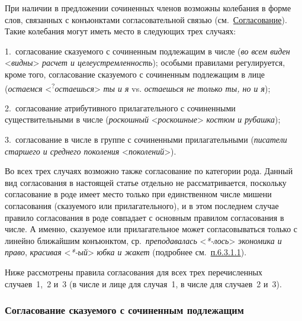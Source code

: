 При наличии в предложении сочиненных членов возможны колебания в форме
слов, связанных с конъюнктами согласовательной связью
(см.~\underline{Согласование}). Такие колебания могут иметь место в
следующих трех случаях:

1.~согласование сказуемого с сочиненным подлежащим в числе (\emph{во
всем виден} \textless{}\emph{видны}\textgreater{} \emph{расчет и
целеустремленность}); особыми правилами регулируется, кроме того,
согласование сказуемого с сочиненным подлежащим в лице (\emph{остаемся}
\textless{}\textsuperscript{?}\emph{остаешься}\textgreater{} \emph{ты и
я} vs. \emph{остаешься не только ты, но и я});

2.~согласование атрибутивного прилагательного с сочиненными
существительными в числе (\emph{роскошный}
\textless{}\emph{роскошные}\textgreater{} \emph{костюм и рубашка});

3.~согласование в числе в группе с сочиненными прилагательными
(\emph{писатели старшего и среднего поколения}
\textless{}\emph{поколений}\textgreater).

Во всех трех случаях возможно также согласование по категории рода.
Данный вид согласования в настоящей статье отдельно не рассматривается,
поскольку согласование в роде имеет место только при единственном числе
мишени согласования (сказуемого или прилагательного), и в этом последнем
случае правило согласования в роде совпадает с основным правилом
согласования в числе. А именно, сказуемое или прилагательное может
согласовываться только с линейно ближайшим конъюнктом,
ср.~\emph{преподавалась} \textless{}\emph{*-лось}\textgreater{}
\emph{экономика и право}, \emph{красивая}
\textless{}\emph{*-ый}\textgreater{} \emph{юбка и жакет} (подробнее
см.~\underline{п.6.3.1.1}).

Ниже рассмотрены правила согласования для всех трех перечисленных
случаев~1,~2 и~3 (в числе и лице для случая~1, в числе для случаев~2
и~3).

\hypertarget{ux441ux43eux433ux43bux430ux441ux43eux432ux430ux43dux438ux435-ux441ux43aux430ux437ux443ux435ux43cux43eux433ux43e-ux441-ux441ux43eux447ux438ux43dux435ux43dux43dux44bux43c-ux43fux43eux434ux43bux435ux436ux430ux449ux438ux43c}{%
\subsubsection{Согласование сказуемого с сочиненным
подлежащим}\label{ux441ux43eux433ux43bux430ux441ux43eux432ux430ux43dux438ux435-ux441ux43aux430ux437ux443ux435ux43cux43eux433ux43e-ux441-ux441ux43eux447ux438ux43dux435ux43dux43dux44bux43c-ux43fux43eux434ux43bux435ux436ux430ux449ux438ux43c}}

